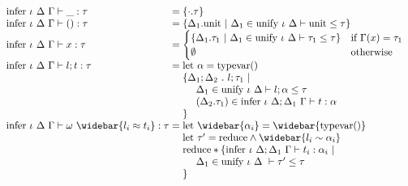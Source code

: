 \documentclass[manuscript]{acmart}
\begin{document}
\begin{figure*}[h]
  \[
    \begin{array}{l @{} l}
      \text{infer } \iota\ \Delta\ \Gamma \vdash 
      \_ : \tau
      &{} =
      \{\cdot.\tau\}
      \\

      \text{infer } \iota\ \Delta\ \Gamma \vdash 
      () : \tau
      &{} =
      \begin{array}[t]{@{} l}
        \{\Delta_1.\text{unit}\ |
        \ \Delta_1 \in \text{unify } \iota\ \Delta \vdash \text{unit} \leq \tau
        \}
      \end{array}
      \\

      \text{infer } \iota\ \Delta\ \Gamma \vdash 
      x : \tau
      &{} =
      \begin{cases}  
        \{\Delta_1.\tau_1\ |
        \ \Delta_1 \in \text{unify } \iota\ \Delta \vdash \tau_1 \leq \tau
        \}
        &\text{if } \Gamma(x) = \tau_1
        \\
        \emptyset
        &\text{otherwise}
      \end{cases}
      \\

      \text{infer } \iota\ \Delta\ \Gamma \vdash 
      l ; t : \tau
      &{} =
      \begin{array}[t]{@{} l}
        \text{let } \alpha = \text{typevar}() 
        \\
        \{\Delta_1;\Delta_2\ .\ l ; \tau_1 \ |
        \\
        \ \ \ \ \Delta_1 \in \text{unify } \iota\ \Delta \vdash l ; \alpha \leq \tau
        \\
        \ \ \ \ (\Delta_2.\tau_1) \in \text{infer } \iota\ \Delta;\Delta_1\ \Gamma \vdash t : \alpha
        \\
        \}
      \end{array}
      \\

      \text{infer } \iota\ \Delta\ \Gamma \vdash 
      \omega\ \widebar{l_i \approx t_i} : \tau
      &{} =
      \begin{array}[t]{@{} l}
        \text{let } \widebar{\alpha_i} = \widebar{\text{typevar}()}
        \\
        \text{let } \tau' = \text{reduce} \wedge \widebar{l_i \sim \alpha_i}
        \\
        \text{reduce} * \{
        \text{infer } \iota\ \Delta;\Delta_1\ \Gamma \vdash t_i : \alpha_i\ |\ 
        \\
        \ \ \ \ \Delta_1 \in \text{unify } \iota\ \Delta\ \vdash \tau' \leq \tau
        \\
        \}
        \\
      \end{array}
      \\


\end{array}\]
\end{figure*}
\end{document}
